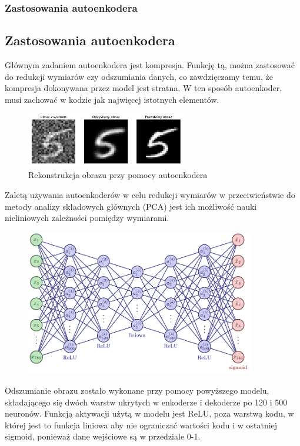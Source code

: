\documentclass{beamer}
\begin{document}
	\begin{frame}
		\frametitle{Zastosowania autoenkodera}
		\subsection{Zastosowania autoenkodera}
		Głównym zadaniem autoenkodera jest kompresja. Funkcję tą, można zastosować do redukcji wymiarów czy odszumiania danych, co zawdzięczamy temu, że kompresja dokonywana przez model jest stratna. W ten sposób autoenkoder, musi zachować w kodzie jak najwięcej istotnych elementów. 
		\vspace{-0.3cm}
		\begin{figure}
			\centering\includegraphics[width=7cm]{denoisingae.pdf}
			\caption{Rekonstrukcja obrazu przy pomocy autoenkodera}
			\label{fig:rekonstrukcja}
		\end{figure}
		\vspace{-0.5cm}
		Zaletą używania autoenkoderów w celu redukcji wymiarów w przeciwieństwie do metody analizy składowych głównych (PCA) jest ich możliwość nauki nieliniowych zależności pomiędzy wymiarami.
	\end{frame}

	\begin{frame}
		\vspace{-1cm}
		\begin{figure}
			\centering\includegraphics[width=10cm]{prawdziwyae.pdf}
		\end{figure}
		\vspace{-0.5cm}
	Odszumianie obrazu zostało wykonane przy pomocy powyższego modelu, składającego się dwóch warstw ukrytych w enkoderze i dekoderze po 120 i 500 neuronów. Funkcją aktywacji użytą w modelu jest ReLU, poza warstwą kodu, w której jest to funkcja liniowa aby nie ograniczać wartości kodu i w ostatniej sigmoid, ponieważ dane wejściowe są w przedziale 0-1.
	\vspace{-0.5cm}
	\end{frame}
\end{document}
